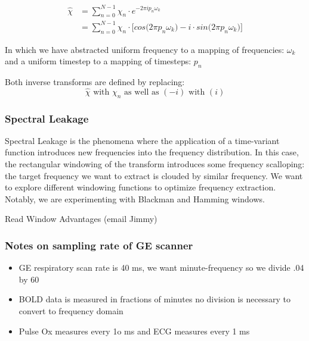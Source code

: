 \documentclass{article}
\begin{document}
\begin{align*}
    \hat{\chi} &= \sum_{n=0}^{N-1} \chi_n \cdot e^{-2\pi i p_n \omega_k}\\[.7em]
    &= \sum_{n=0}^{N-1} \chi_n \cdot \Big[ cos\big({2\pi p_n \omega_k}\big) - i\cdot sin\big({2\pi p_n \omega_k}\big) \Big]
\end{align*}

In which we have abstracted uniform frequency to a mapping of frequencies: $\omega_k$
and a uniform timestep to a mapping of timesteps: $p_n$

Both inverse transforms are defined by replacing: %
$$\hat{\chi} \text{ with } \chi_n\text{ as well as }(-i)\text{ with }(i)$$
\subsubsection*{Spectral Leakage}
Spectral Leakage is the phenomena where the application of a time-variant function introduces new frequencies into the frequency distribution. In this case, the rectangular windowing of the transform introduces some frequency scalloping: the target frequency we want to extract is clouded by similar frequency. We want to explore different windowing functions to optimize frequency extraction. Notably, we are experimenting with Blackman and Hamming windows.

Read Window Advantages (email Jimmy)

\subsubsection*{Notes on sampling rate of GE scanner}
\begin{itemize}
    \item GE respiratory scan rate is 40 ms, we want minute-frequency so we divide .04 by 60
    \item BOLD data is measured in fractions of minutes no division is necessary to convert to frequency domain
    \item Pulse Ox measures every 1o ms and ECG measures every 1 ms
\end{itemize}


\end{document}
